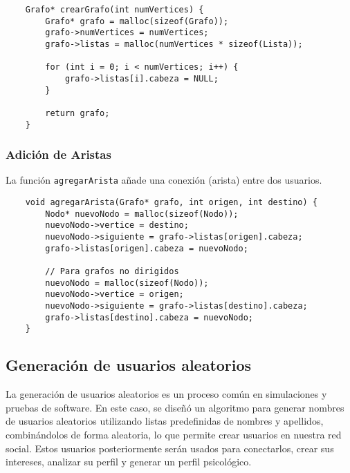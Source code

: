 \documentclass[9pt,letterpaper,onecolumn]{rho-class/rho}
\begin{document}
    \begin{verbatim}
    Grafo* crearGrafo(int numVertices) {
        Grafo* grafo = malloc(sizeof(Grafo));
        grafo->numVertices = numVertices;
        grafo->listas = malloc(numVertices * sizeof(Lista));

        for (int i = 0; i < numVertices; i++) {
            grafo->listas[i].cabeza = NULL;
        }

        return grafo;
    }
    \end{verbatim}

    \subsubsection{Adición de Aristas}
    La función \texttt{agregarArista} añade una conexión (arista) entre dos usuarios.

    \begin{verbatim}
    void agregarArista(Grafo* grafo, int origen, int destino) {
        Nodo* nuevoNodo = malloc(sizeof(Nodo));
        nuevoNodo->vertice = destino;
        nuevoNodo->siguiente = grafo->listas[origen].cabeza;
        grafo->listas[origen].cabeza = nuevoNodo;

        // Para grafos no dirigidos
        nuevoNodo = malloc(sizeof(Nodo));
        nuevoNodo->vertice = origen;
        nuevoNodo->siguiente = grafo->listas[destino].cabeza;
        grafo->listas[destino].cabeza = nuevoNodo;
    }
    \end{verbatim}

    \subsection{Generación de usuarios aleatorios}
    La generación de usuarios aleatorios es un proceso común en simulaciones y pruebas de software. 
    En este caso, se diseñó un algoritmo para generar nombres de usuarios aleatorios utilizando listas predefinidas de nombres y apellidos, combinándolos de forma aleatoria, lo que permite crear usuarios en nuestra red social.
    Estos usuarios posteriormente serán usados para conectarlos, crear sus intereses, analizar su perfil y generar un perfil psicológico.
\end{document}
